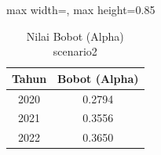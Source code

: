 \begin{table}[H]
\centering
\caption{Nilai Bobot (Alpha) scenario2} \label{tab:sample2alpha}
\begin{adjustbox}{max width=\textwidth, max height=0.85\textheight}
\begin{tabular}{|c|c|}
\hline
\textbf{Tahun} & \textbf{Bobot (Alpha)} \\
\hline
2020 & 0.2794 \\
2021 & 0.3556 \\
2022 & 0.3650 \\
\hline
\end{tabular}
\end{adjustbox}
\end{table}